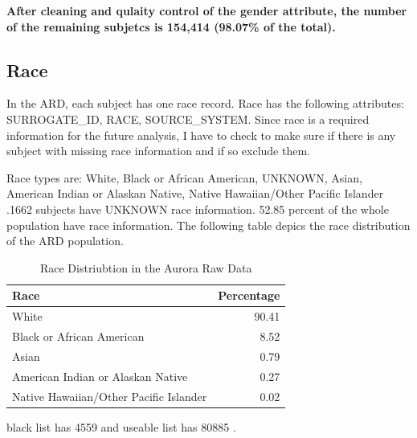 \documentclass{article}
\begin{document}
\textbf{After cleaning and qulaity control of the gender attribute, the number of the remaining subjetcs is 154,414 (98.07\% of the total).} 

\subsection{Race}
In the ARD, each subject has one race record. Race has the following attributes:
SURROGATE\_ID, RACE, SOURCE\_SYSTEM.
Since race is a required information for the future analysis, I have to check to make sure if there is any subject with missing race information and if so exclude them.

Race types are: White, Black or African American, UNKNOWN, Asian,
American Indian or Alaskan Native, Native Hawaiian/Other Pacific
Islander .1662 subjects have UNKNOWN race information. 52.85 percent of the whole population have race information.
The following table depics the race distribution of the ARD population.

\begin{table}[ht]
\centering
\begin{tabular}{lr}
  \hline
Race & Percentage \\ 
  \hline
White & 90.41 \\ 
  Black or African American & 8.52 \\ 
  Asian & 0.79 \\ 
  American Indian or Alaskan Native & 0.27 \\ 
  Native Hawaiian/Other Pacific Islander & 0.02 \\ 
   \hline
\end{tabular}
\caption{Race Distriubtion in the Aurora Raw Data} 
\label{Table:3}
\end{table}
black list has 4559 and useable list has 80885 .
\end{document}
